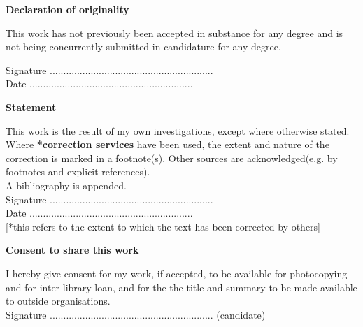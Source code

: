 \thispagestyle{empty}

\begin{center}
    {\LARGE\bf Declaration of originality}
\end{center}

This work has not previously been accepted in substance for any degree and is not being concurrently submitted in candidature for any degree.

\vspace{3em}
Signature ............................................................ \\

\vspace{1em}
Date ............................................................ \\

\begin{center}
    {\LARGE\bf Statement}
\end{center} 

This work is the result of my own investigations, except where otherwise stated. 
Where \textbf{*correction services} have been used, the extent and nature of the correction is marked in a footnote(s).
Other sources are acknowledged(e.g. by footnotes and explicit references).\\
A bibliography is appended.\\

\vspace{3em}
Signature ............................................................  \\

\vspace{1em}
Date ............................................................ \\

[*this refers to the extent to which the text has been corrected by others]\\

\begin{center}
    {\LARGE\bf Consent to share this work}
\end{center}
I hereby give consent for my work, if accepted, to be available for photocopying and for inter-library loan, and for the the title and summary to be made available to outside organisations.\\

\vspace{3em}
Signature ............................................................  (candidate)\\

